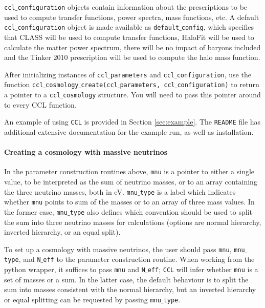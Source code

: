 \documentclass[\docopts]{\docclass}
\newcommand{\ccl}{{\tt CCL}\xspace}
\begin{document}
{\tt ccl$\_$configuration} objects contain information about the prescriptions to be used to compute transfer functions, power spectra, mass functions, etc. A default {\tt ccl$\_$configuration} object is made available as {\tt default$\_$config}, which specifies that CLASS will be used to compute transfer functions, HaloFit will be used to calculate the matter power spectrum, there will be no impact of baryons included and the Tinker 2010 prescription will be used to compute the halo mass function.

After initializing instances of {\tt ccl$\_$parameters} and {\tt ccl$\_$configuration}, use the function {\tt ccl$\_$cosmology$\_$create(ccl$\_$parameters, ccl$\_$configuration)} to return a pointer to a {\tt ccl$\_$cosmology} structure. You will need to pass this pointer around to every CCL function.

An example of using \ccl is provided in Section \ref{sec:example}. The {\tt README} file has additional extensive documentation for the example run, as well as installation.

\paragraph{Creating a cosmology with massive neutrinos}
In the parameter construction routines above, {\tt mnu} is a pointer to either a single value, to be interpreted as the sum of neutrino masses, or to an array containing the three neutrino masses, both in eV. {\tt mnu$\_$type} is a label which indicates whether {\tt mnu} points to sum of the masses or to an array of three mass values. In the former case, {\tt mnu$\_$type} also defines which convention should be used to split the sum into three neutrino masses for calculations (options are normal hierarchy, inverted hierarchy, or an equal split).

To set up a cosmology with massive neutrinos, the user should pass {\tt mnu}, {\tt mnu$\_$type}, and {\tt N$\_$eff} to the parameter construction routine. When working from the python wrapper, it suffices to pass {\tt mnu} and {\tt N$\_$eff}; \ccl will infer whether {\tt mnu} is a set of masses or a sum. In the latter case, the default behaviour is to split the sum into masses consistent with the normal hierarchy, but an inverted hierarchy or equal splitting can be requested by passing {\tt mnu$\_$type}. 
\end{document}
